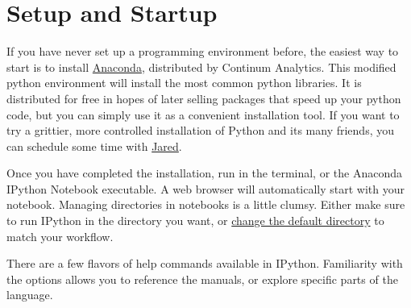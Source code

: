\documentclass[justified, nobib]{tufte-handout}
\makeatletter
\newcommand{\anacondaLink}{https://store.continuum.io/cshop/anaconda/}
\newcommand{\email}{mailto:jgarst@ucdavis.edu}
\newcommand{\customizeDirectoryLink}
  {http://stackoverflow.com/questions/15680463/change-ipython-working-directory}
\makeatother
\begin{document}
\section*{Setup and Startup}
If you have never set up a programming environment before, the easiest way to
start is to install \href{\anacondaLink}{Anaconda}, distributed by Continum
Analytics. This modified python environment will install the most common python
libraries. It is distributed for free in hopes of later selling packages that
speed up your python code, but you can simply use it as a convenient
installation tool. If you want to try a grittier, more controlled installation
of Python and its many friends, you can schedule some time with
\href{\email}{Jared}.

\smallskip
\noindent
Once you have completed the installation, run  in
the terminal, or the Anaconda IPython Notebook executable.
A web browser will automatically start with your notebook.
Managing directories in notebooks is a little clumsy.
Either make sure to run IPython in the directory you want, or
\href{\customizeDirectoryLink}{change the default directory} to match your
workflow.

\smallskip
\noindent
There are a few flavors of help commands available in IPython. Familiarity with
the options allows you to reference the manuals, or explore specific parts of
the language.   \\
\end{document}
